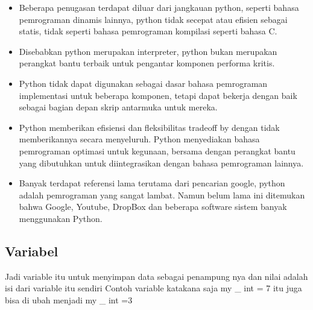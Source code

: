 	\begin{itemize}
		\item Beberapa penugasan terdapat diluar dari jangkauan python, seperti bahasa pemrograman dinamis lainnya, python tidak secepat atau eﬁsien sebagai statis, tidak seperti bahasa pemrograman kompilasi seperti bahasa C. 
		\item Disebabkan python merupakan interpreter, python bukan merupakan perangkat bantu terbaik untuk pengantar komponen performa kritis. 
		\item Python tidak dapat digunakan sebagai dasar bahasa pemrograman implementasi untuk beberapa komponen, tetapi dapat bekerja dengan baik sebagai bagian depan skrip antarmuka untuk mereka. 
		\item Python memberikan eﬁsiensi dan ﬂeksibilitas tradeoff by dengan tidak memberikannya secara menyeluruh. Python menyediakan bahasa pemrograman optimasi untuk kegunaan, bersama dengan perangkat bantu yang dibutuhkan untuk diintegrasikan dengan bahasa pemrograman lainnya.
		\item Banyak terdapat referensi lama terutama dari pencarian google, python adalah pemrograman yang sangat lambat. Namun belum lama ini ditemukan bahwa Google, Youtube, DropBox dan beberapa software sistem banyak menggunakan Python.
	\end{itemize}
	
 \subsection{Variabel}
 Jadi variable itu untuk menyimpan data sebagai penampung nya dan nilai adalah isi dari variable itu sendiri 
 Contoh variable katakana saja my \_ int = 7 itu juga bisa di ubah menjadi my \_ int =3  
 
